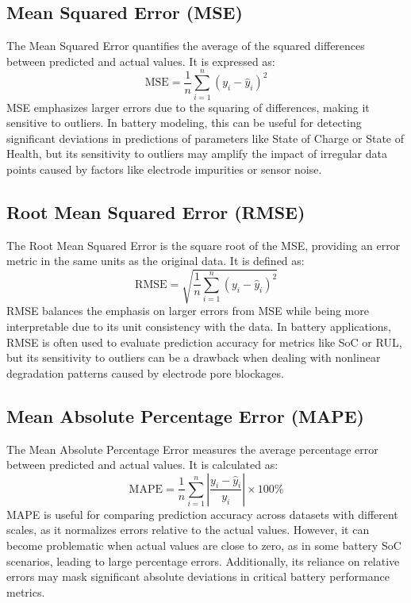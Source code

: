 \subsection{Mean Squared Error (MSE)}
The Mean Squared Error quantifies the average of the squared differences between predicted and actual values. It is expressed as:
\begin{equation}
\text{MSE} = \frac{1}{n} \sum_{i=1}^{n} (y_i - \hat{y}_i)^2
\end{equation}
MSE emphasizes larger errors due to the squaring of differences, making it sensitive to outliers. In battery modeling, this can be useful for detecting significant deviations in predictions of parameters like State of Charge or State of Health, but its sensitivity to outliers may amplify the impact of irregular data points caused by factors like electrode impurities or sensor noise.

\subsection{Root Mean Squared Error (RMSE)}
The Root Mean Squared Error is the square root of the MSE, providing an error metric in the same units as the original data. It is defined as:
\begin{equation}
\text{RMSE} = \sqrt{\frac{1}{n} \sum_{i=1}^{n} (y_i - \hat{y}_i)^2}
\end{equation}
RMSE balances the emphasis on larger errors from MSE while being more interpretable due to its unit consistency with the data. In battery applications, RMSE is often used to evaluate prediction accuracy for metrics like SoC or RUL, but its sensitivity to outliers can be a drawback when dealing with nonlinear degradation patterns caused by electrode pore blockages.

\subsection{Mean Absolute Percentage Error (MAPE)}
The Mean Absolute Percentage Error measures the average percentage error between predicted and actual values. It is calculated as:
\begin{equation}
\text{MAPE} = \frac{1}{n} \sum_{i=1}^{n} \left| \frac{y_i - \hat{y}_i}{y_i} \right| \times 100\%
\end{equation}
MAPE is useful for comparing prediction accuracy across datasets with different scales, as it normalizes errors relative to the actual values. However, it can become problematic when actual values are close to zero, as in some battery SoC scenarios, leading to large percentage errors. Additionally, its reliance on relative errors may mask significant absolute deviations in critical battery performance metrics.

